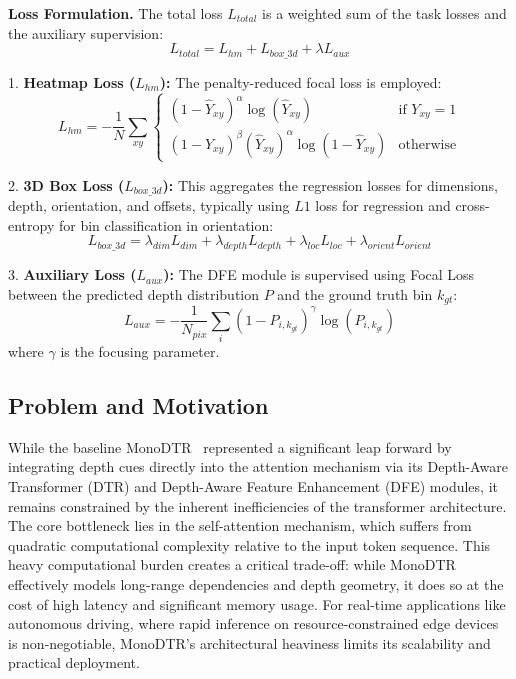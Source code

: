 \textbf{Loss Formulation.}
The total loss $L_{total}$ is a weighted sum of the task losses and the auxiliary supervision:
\begin{equation}
    L_{total} = L_{hm} + L_{box\_3d} + \lambda L_{aux}
\end{equation}

1. \textbf{Heatmap Loss ($L_{hm}$):} The penalty-reduced focal loss is employed:
\begin{equation}
    L_{hm} = -\frac{1}{N} \sum_{xy} \begin{cases} 
    (1 - \hat{Y}_{xy})^\alpha \log(\hat{Y}_{xy}) & \text{if } Y_{xy}=1 \\
    (1 - Y_{xy})^\beta (\hat{Y}_{xy})^\alpha \log(1 - \hat{Y}_{xy}) & \text{otherwise}
    \end{cases}
\end{equation}

2. \textbf{3D Box Loss ($L_{box\_3d}$):} This aggregates the regression losses for dimensions, depth, orientation, and offsets, typically using $L1$ loss for regression and cross-entropy for bin classification in orientation:
\begin{equation}
    L_{box\_3d} = \lambda_{dim}L_{dim} + \lambda_{depth}L_{depth} + \lambda_{loc}L_{loc} + \lambda_{orient}L_{orient}
\end{equation}

3. \textbf{Auxiliary Loss ($L_{aux}$):} The DFE module is supervised using Focal Loss between the predicted depth distribution $P$ and the ground truth bin $k_{gt}$:
\begin{equation}
    L_{aux} = -\frac{1}{N_{pix}} \sum_{i} (1 - P_{i, k_{gt}})^\gamma \log(P_{i, k_{gt}})
\end{equation}
where $\gamma$ is the focusing parameter.

\subsection{Problem and Motivation}
While the baseline MonoDTR~\cite{MonoDTR} represented a significant leap forward by integrating depth cues directly into the attention mechanism via its Depth-Aware Transformer (DTR) and Depth-Aware Feature Enhancement (DFE) modules, it remains constrained by the inherent inefficiencies of the transformer architecture. The core bottleneck lies in the self-attention mechanism, which suffers from quadratic computational complexity relative to the input token sequence. This heavy computational burden creates a critical trade-off: while MonoDTR effectively models long-range dependencies and depth geometry, it does so at the cost of high latency and significant memory usage. For real-time applications like autonomous driving, where rapid inference on resource-constrained edge devices is non-negotiable, MonoDTR’s architectural heaviness limits its scalability and practical deployment.

